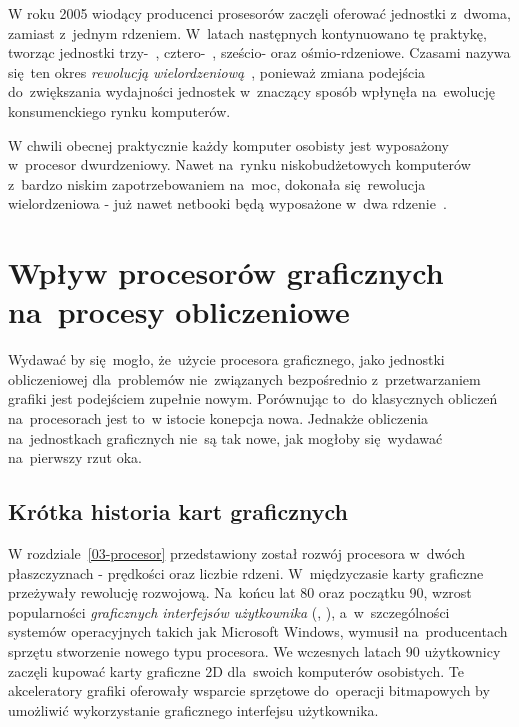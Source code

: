 W roku 2005 wiodący producenci prosesorów zaczęli oferować jednostki z~dwoma, zamiast z~jednym rdzeniem. W~latach następnych kontynuowano tę praktykę, tworząc jednostki trzy-~, cztero-~, sześcio- oraz ośmio-rdzeniowe. Czasami nazywa się~ten okres \emph{rewolucją wielordzeniową}~\cite{Cuda:Example}, ponieważ zmiana podejścia do~zwiększania wydajności jednostek w~znaczący sposób wpłynęła na~ewolucję konsumenckiego rynku komputerów.

W chwili obecnej praktycznie każdy komputer osobisty jest wyposażony w~procesor dwurdzeniowy. Nawet na~rynku niskobudżetowych komputerów z~bardzo niskim zapotrzebowaniem na~moc, dokonała się~rewolucja wielordzeniowa - już nawet netbooki będą wyposażone w~dwa rdzenie~\cite{intel:netbook}. 

\section{Wpływ procesorów graficznych na~procesy obliczeniowe}

Wydawać by się~mogło, że~użycie procesora graficznego, jako jednostki obliczeniowej dla~problemów nie~związanych bezpośrednio z~przetwarzaniem grafiki jest podejściem zupełnie nowym. Porównując to~do klasycznych obliczeń na~procesorach jest to~w istocie konepcja nowa. Jednakże obliczenia na~jednostkach graficznych nie~są tak nowe, jak mogłoby się~wydawać na~pierwszy rzut oka. 

\subsection{Krótka historia kart graficznych}

W rozdziale~\ref{03-procesor} przedstawiony został rozwój procesora w~dwóch płaszczyznach - prędkości oraz liczbie rdzeni. W~międzyczasie karty graficzne przeżywały rewolucję rozwojową. Na~końcu lat 80 oraz początku 90, wzrost popularności \emph{graficznych interfejsów użytkownika} (, ), a~w~szczególności systemów operacyjnych takich jak Microsoft Windows, wymusił na~producentach sprzętu stworzenie nowego typu procesora. We wczesnych latach 90 użytkownicy zaczęli kupować karty graficzne 2D dla~swoich komputerów osobistych. Te akceleratory grafiki oferowały wsparcie sprzętowe do~operacji bitmapowych by umożliwić wykorzystanie graficznego interfejsu użytkownika.

